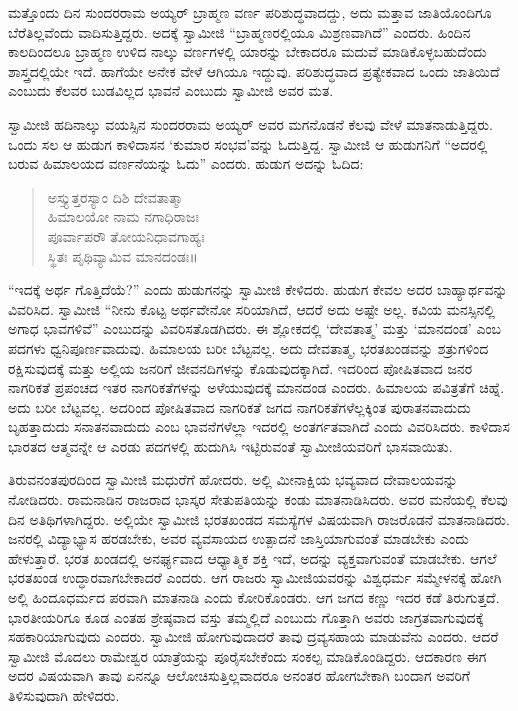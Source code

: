  ಮತ್ತೊಂದು ದಿನ ಸುಂದರರಾಮ ಅಯ್ಯರ್ ಬ್ರಾಹ್ಮಣ ವರ್ಣ ಪರಿಶುದ್ಧವಾದದ್ದು, ಅದು ಮತ್ತಾವ ಜಾತಿಯೊಂದಿಗೂ ಬೆರೆತಿಲ್ಲವೆಂದು ವಾದಿಸುತ್ತಿದ್ದರು. ಅದಕ್ಕೆ ಸ್ವಾಮೀಜಿ “ಬ್ರಾಹ್ಮಣರಲ್ಲಿಯೂ ಮಿಶ್ರಣವಾಗಿದೆ” ಎಂದರು. ಹಿಂದಿನ ಕಾಲದಿಂದಲೂ ಬ್ರಾಹ್ಮಣ ಉಳಿದ ನಾಲ್ಕು ವರ್ಣಗಳಲ್ಲಿ ಯಾರನ್ನು ಬೇಕಾದರೂ ಮದುವೆ ಮಾಡಿಕೊಳ್ಳಬಹುದೆಂದು ಶಾಸ್ತ್ರದಲ್ಲಿಯೇ ಇದೆ. ಹಾಗೆಯೇ ಅನೇಕ ವೇಳೆ ಆಗಿಯೂ ಇದ್ದುವು. ಪರಿಶುದ್ಧವಾದ ಪ್ರತ್ಯೇಕವಾದ ಒಂದು ಜಾತಿಯಿದೆ ಎಂಬುದು ಕೆಲವರ ಬುಡವಿಲ್ಲದ ಭಾವನೆ ಎಂಬುದು ಸ್ವಾಮೀಜಿ ಅವರ ಮತ. 

 ಸ್ವಾಮೀಜಿ ಹದಿನಾಲ್ಕು ವಯಸ್ಸಿನ ಸುಂದರರಾಮ ಅಯ್ಯರ್ ಅವರ ಮಗನೊಡನೆ ಕೆಲವು ವೇಳೆ ಮಾತನಾಡುತ್ತಿದ್ದರು. ಒಂದು ಸಲ ಆ ಹುಡುಗ ಕಾಳಿದಾಸನ ‘ಕುಮಾರ ಸಂಭವ’ವನ್ನು ಓದುತ್ತಿದ್ದ. ಸ್ವಾಮೀಜಿ ಆ ಹುಡುಗನಿಗೆ “ಅದರಲ್ಲಿ ಬರುವ ಹಿಮಾಲಯದ ವರ್ಣನೆಯನ್ನು ಓದು” ಎಂದರು. ಹುಡುಗ ಅದನ್ನು ಓದಿದ:

\begin{verse}
ಅಸ್ತ್ಯುತ್ತರಸ್ಯಾಂ ದಿಶಿ ದೇವತಾತ್ಮಾ\\ಹಿಮಾಲಯೋ ನಾಮ ನಗಾಧಿರಾಜಃ\\ಪೂರ್ವಾಪರೌ ತೋಯನಿಧಾವಗಾಹ್ಯಃ\\ಸ್ಥಿತಃ ಪೃಥಿವ್ಯಾಮಿವ ಮಾನದಂಡಃ॥ 
\end{verse}

\vskip 2pt

 “ಇದಕ್ಕೆ ಅರ್ಥ ಗೊತ್ತಿದೆಯೆ?” ಎಂದು ಹುಡುಗನನ್ನು ಸ್ವಾಮೀಜಿ ಕೇಳಿದರು. ಹುಡುಗ ಕೇವಲ ಅದರ ಬಾಹ್ಯಾರ್ಥವನ್ನು ವಿವರಿಸಿದ. ಸ್ವಾಮೀಜಿ “ನೀನು ಕೊಟ್ಟ ಅರ್ಥವೇನೋ ಸರಿಯಾಗಿದೆ, ಆದರೆ ಅದು ಅಷ್ಟೇ ಅಲ್ಲ. ಕವಿಯ ಮನಸ್ಸಿನಲ್ಲಿ ಅಗಾಧ ಭಾವಗಳಿವೆ” ಎಂಬುದನ್ನು ವಿವರಿಸತೊಡಗಿದರು. ಈ ಶ್ಲೋಕದಲ್ಲಿ ‘ದೇವತಾತ್ಮ’ ಮತ್ತು ‘ಮಾನದಂಡ’ ಎಂಬ ಪದಗಳು ಧ್ವನಿಪೂರ್ಣವಾದುವು. ಹಿಮಾಲಯ ಬರೀ ಬೆಟ್ಟವಲ್ಲ. ಅದು ದೇವತಾತ್ಮ, ಭರತಖಂಡವನ್ನು ಶತ್ರುಗಳಿಂದ ರಕ್ಷಿಸುವುದಕ್ಕೆ ಮತ್ತು ಅಲ್ಲಿಯ ಜನರಿಗೆ ಜೀವನದಿಗಳನ್ನು ಕೊಡುವುದಕ್ಕಾಗಿದೆ. ಇದರಿಂದ ಪೋಷಿತವಾದ ಜನರ ನಾಗರಿಕತೆ ಪ್ರಪಂಚದ ಇತರ ನಾಗರಿಕತೆಗಳನ್ನು ಅಳೆಯುವುದಕ್ಕೆ ಮಾನದಂಡ ಎಂದರು. ಹಿಮಾಲಯ ಪವಿತ್ರತೆಗೆ ಚಿಹ್ನೆ. ಅದು ಬರೀ ಬೆಟ್ಟವಲ್ಲ. ಅದರಿಂದ ಪೋಷಿತವಾದ ನಾಗರಿಕತೆ ಜಗದ ನಾಗರಿಕತೆಗಳೆಲ್ಲಕ್ಕಿಂತ ಪುರಾತನವಾದುದು ಬೃಹತ್ತಾದುದು ಸನಾತನವಾದುದು ಎಂಬ ಭಾವನೆಗಳೆಲ್ಲಾ ಇದರಲ್ಲಿ ಅಂತರ್ಗತವಾಗಿದೆ ಎಂದು ವಿವರಿಸಿದರು. ಕಾಳಿದಾಸ ಭಾರತದ ಆತ್ಮವನ್ನೇ ಆ ಎರಡು ಪದಗಳಲ್ಲಿ ಹುದುಗಿಸಿ ಇಟ್ಟಿರುವಂತೆ ಸ್ವಾಮೀಜಿಯವರಿಗೆ ಭಾಸವಾಯಿತು. 

\vskip 2pt

 ತಿರುವನಂತಪುರದಿಂದ ಸ್ವಾಮೀಜಿ ಮಧುರೆಗೆ ಹೋದರು. ಅಲ್ಲಿ ಮೀನಾಕ್ಷಿಯ ಭವ್ಯವಾದ ದೇವಾಲಯವನ್ನು ನೋಡಿದರು. ರಾಮನಾಡಿನ ರಾಜರಾದ ಭಾಸ್ಕರ ಸೇತುಪತಿಯನ್ನು ಕಂಡು ಮಾತನಾಡಿಸಿದರು. ಅವರ ಮನೆಯಲ್ಲಿ ಕೆಲವು ದಿನ ಅತಿಥಿಗಳಾಗಿದ್ದರು. ಅಲ್ಲಿಯೇ ಸ್ವಾಮೀಜಿ ಭರತಖಂಡದ ಸಮಸ್ಯೆಗಳ ವಿಷಯವಾಗಿ ರಾಜರೊಡನೆ ಮಾತನಾಡಿದರು. ಜನರಲ್ಲಿ ವಿದ್ಯಾಭ್ಯಾಸ ಹರಡಬೇಕು, ಅವರ ವ್ಯವಸಾಯದ ಉತ್ಪಾದನೆ ಜಾಸ್ತಿಯಾಗುವಂತೆ ಮಾಡಬೇಕು ಎಂದು ಹೇಳುತ್ತಾರೆ. ಭರತ ಖಂಡದಲ್ಲಿ ಅನರ್ಘ್ಯವಾದ ಆಧ್ಯಾತ್ಮಿಕ ಶಕ್ತಿ ಇದೆ, ಅದನ್ನು ವ್ಯಕ್ತವಾಗುವಂತೆ ಮಾಡಬೇಕು. ಆಗಲೆ ಭರತಖಂಡ ಉದ್ಧಾರವಾಗಬೇಕಾದರೆ ಎಂದರು. ಆಗ ರಾಜರು ಸ್ವಾಮೀಜಿಯವರನ್ನು ವಿಶ್ವಧರ್ಮ ಸಮ್ಮೇಳನಕ್ಕೆ ಹೋಗಿ ಅಲ್ಲಿ ಹಿಂದೂಧರ್ಮದ ಪರವಾಗಿ ಮಾತನಾಡಿ ಎಂದು ಕೋರಿಕೊಂಡರು. ಆಗ ಜಗದ ಕಣ್ಣು ಇದರ ಕಡೆ ತಿರುಗುತ್ತದೆ. ಭಾರತೀಯರಿಗೂ ಕೂಡ ಎಂತಹ ಶ್ರೇಷ್ಠವಾದ ವಸ್ತು ತಮ್ಮಲ್ಲಿದೆ ಎಂಬುದು ಗೊತ್ತಾಗಿ ಅವರು ಜಾಗ್ರತವಾಗುವುದಕ್ಕೆ ಸಹಕಾರಿಯಾಗುವುದು ಎಂದರು. ಸ್ವಾಮೀಜಿ ಹೋಗುವುದಾದರೆ ತಾವು ದ್ರವ್ಯಸಹಾಯ ಮಾಡುವೆನು ಎಂದರು. ಆದರೆ ಸ್ವಾಮೀಜಿ ಮೊದಲು ರಾಮೇಶ್ವರ ಯಾತ್ರೆಯನ್ನು ಪೂರೈಸಬೇಕೆಂದು ಸಂಕಲ್ಪ ಮಾಡಿಕೊಂಡಿದ್ದರು. ಆದಕಾರಣ ಈಗ ಅದರ ವಿಷಯವಾಗಿ ತಾವು ಏನನ್ನೂ ಆಲೋಚಿಸುತ್ತಿಲ್ಲವಾದರೂ ಅನಂತರ ಹೋಗಬೇಕಾಗಿ ಬಂದಾಗ ಅವರಿಗೆ ತಿಳಿಸುವುದಾಗಿ ಹೇಳಿದರು. 

